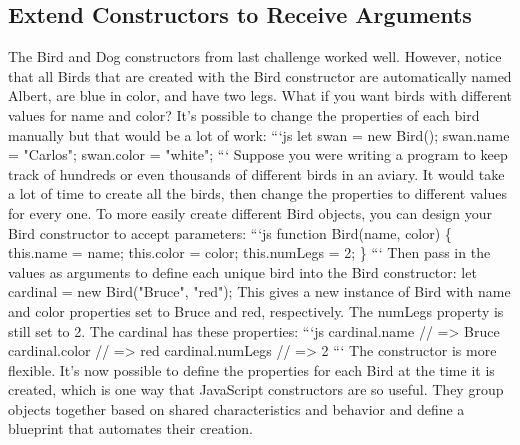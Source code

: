 \documentclass{article}%
\begin{document}
\subsection{Extend Constructors to Receive Arguments}%
\label{subsec:ExtendConstructorstoReceiveArguments}%
The Bird and Dog constructors from last challenge worked well. However, notice that all Birds that are created with the Bird constructor are automatically named Albert, are blue in color, and have two legs. What if you want birds with different values for name and color? It's possible to change the properties of each bird manually but that would be a lot of work:\newline%
```js\newline%
let swan = new Bird();\newline%
swan.name = "Carlos";\newline%
swan.color = "white";\newline%
```\newline%
Suppose you were writing a program to keep track of hundreds or even thousands of different birds in an aviary. It would take a lot of time to create all the birds, then change the properties to different values for every one.\newline%
To more easily create different Bird objects, you can design your Bird constructor to accept parameters:\newline%
```js\newline%
function Bird(name, color) \{\newline%
  this.name = name;\newline%
  this.color = color;\newline%
  this.numLegs = 2;\newline%
\}\newline%
```\newline%
Then pass in the values as arguments to define each unique bird into the Bird constructor:\newline%
let cardinal = new Bird("Bruce", "red");\newline%
This gives a new instance of Bird with name and color properties set to Bruce and red, respectively. The numLegs property is still set to 2.\newline%
The cardinal has these properties:\newline%
```js\newline%
cardinal.name // => Bruce\newline%
cardinal.color // => red\newline%
cardinal.numLegs // => 2\newline%
```\newline%
The constructor is more flexible. It's now possible to define the properties for each Bird at the time it is created, which is one way that JavaScript constructors are so useful. They group objects together based on shared characteristics and behavior and define a blueprint that automates their creation.\newline%
\end{document}
